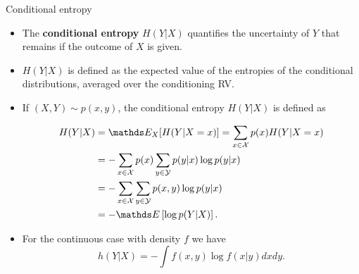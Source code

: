\begin{vbframe}{Conditional entropy}
\begin{itemize}

\item The \textbf{conditional entropy} $H(Y|X)$ quantifies the uncertainty of $Y$ that remains if the outcome of $X$ is given.

\item $H(Y|X)$ is defined as the expected value of the entropies of the conditional distributions, averaged over the conditioning RV.
\item If $(X, Y) \sim p(x, y)$, the conditional entropy $H (Y|X)$ is defined as


\vspace{-0.2cm}
\footnotesize
\begin{equation*}\begin{aligned}
H(Y | X) &= \E_X[H(Y|X=x)] = \sum_{x \in \Xspace} p(x) H(Y | X=x) \\
&=-\sum_{x \in \Xspace} p(x) \sum_{y \in \Yspace} p(y | x) \log p(y | x) \\
&=-\sum_{x \in \Xspace} \sum_{y \in \Yspace} p(x, y) \log p(y | x) \\
&=-\E \left[\log p(Y | X) \right]. 
\end{aligned}\end{equation*}
\normalsize

\item For the continuous case with density $f$ we have $$h(Y|X) = - \int f(x,y) \log f(x|y) dx dy.$$
\end{itemize}

\end{vbframe}



